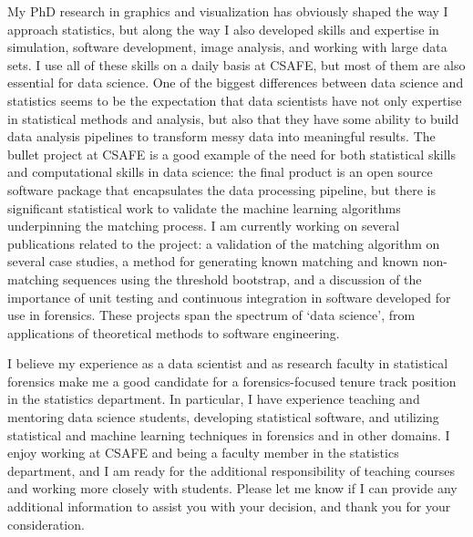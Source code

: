 \documentclass[12pt, letterpaper, sans]{moderncv}
\begin{document}
My PhD research in graphics and visualization has obviously shaped the way I approach statistics, but along the way I also developed skills and expertise in simulation, software development, image analysis, and working with large data sets. I use all of these skills on a daily basis at CSAFE, but most of them are also essential for data science. One of the biggest differences between data science and statistics seems to be the expectation that data scientists have not only expertise in statistical methods and analysis, but also that they have some ability to build data analysis pipelines to transform messy data into meaningful results. The bullet project at CSAFE is a good example of the need for both statistical skills and computational skills in data science: the final product is an open source software package that encapsulates the data processing pipeline, but there is significant statistical work to validate the machine learning algorithms underpinning the matching process. I am currently working on several publications related to the project: a validation of the matching algorithm on several case studies, a method for generating known matching and known non-matching sequences using the threshold bootstrap, and a discussion of the importance of unit testing and continuous integration in software developed for use in forensics. These projects span the spectrum of `data science', from applications of theoretical methods to software engineering. 

I believe my experience as a data scientist and as research faculty in statistical forensics make me a good candidate for a forensics-focused tenure track position in the statistics department. In particular, I have experience teaching and mentoring data science students, developing statistical software, and utilizing statistical and machine learning techniques in forensics and in other domains. I enjoy working at CSAFE and being a faculty member in the statistics department, and I am ready for the additional responsibility of teaching courses and working more closely with students. Please let me know if I can provide any additional information to assist you with your decision, and thank you for your consideration.  
\end{document}
